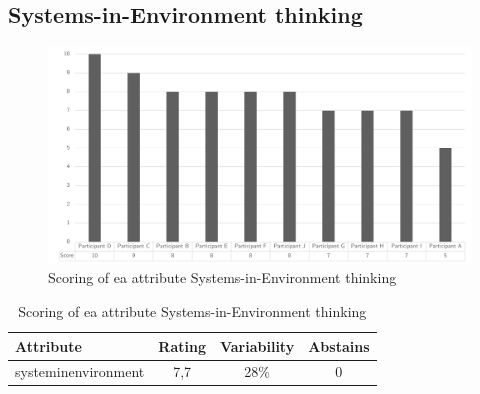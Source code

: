 \subsection{Systems-in-Environment thinking}
\begin{figure}[H]
	\centering
	\includegraphics[width=0.9\linewidth]{images/scoreeasystemsinenvironmentthinking}
	\caption[Scoring of \gls{ea} attribute Systems-in-Environment thinking]{Scoring of \gls{ea} attribute Systems-in-Environment thinking}
	\label{fig:appscoringeasystemsinenvironmentthinking}
\end{figure}
\begin{table}[H]
	\centering
	\begin{tabular}{p{}ccc}
		\toprule
		\textbf{Attribute} & \textbf{Rating} & \textbf{Variability} & \textbf{Abstains} \\
		\midrule
		\Gls{systeminenvironment} & 7,7 & 28\% & 0 \\%
		\bottomrule
	\end{tabular}%
	\caption[Scoring of \gls{ea} attribute Systems-in-Environment thinking]{Scoring of \gls{ea} attribute Systems-in-Environment thinking}
	\label{tab:appscoringeasystemsinenvironmentthinking}%
\end{table}%
\newpage
